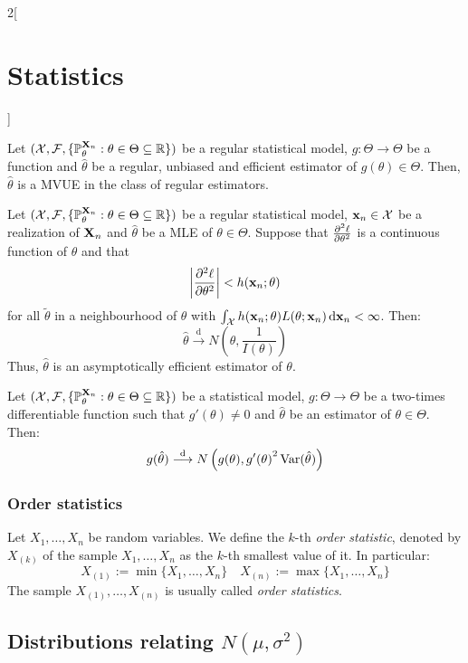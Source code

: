 \documentclass[../../../main.tex]{subfiles}
\begin{document}
\begin{multicols}{2}[\section{Statistics}]
\begin{definition}
  \end{definition}
  \begin{proposition}
    Let $(\mathcal{X},\mathcal{F},\{\mathbb{P}_{\theta}^{\boldsymbol{\mathrm{X}}_n}:\theta\in\Theta\subseteq\mathbb{R}\})$ be a regular statistical model, $g:\Theta\rightarrow\Theta$ be a function and ${\hat\theta}$ be a regular, unbiased and efficient estimator of $g({\theta})\in\Theta$. Then, $\hat\theta$ is a MVUE in the class of regular estimators.
  \end{proposition}
  \begin{theorem}
    Let $(\mathcal{X},\mathcal{F},\{\mathbb{P}_{\theta}^{\boldsymbol{\mathrm{X}}_n}:\theta\in\Theta\subseteq \mathbb{R}\})$ be a regular statistical model, $\boldsymbol{\mathrm{x}}_n\in\mathcal{X}$ be a realization of $\boldsymbol{\mathrm{X}}_n$ and ${\hat\theta}$ be a MLE of ${\theta}\in\Theta$. Suppose that $\pdv[2]{\ell}{\theta}$ is a continuous function of $\theta$ and that $$\left|\pdv[2]{\ell}{\theta}(\tilde{\theta};\boldsymbol{\mathrm{x}}_n)\right|<h(\boldsymbol{\mathrm{x}}_n;\theta)$$
    for all $\tilde{\theta}$ in a neighbourhood of $\theta$ with $\int_\mathcal{X}h(\boldsymbol{\mathrm{x}}_n;\theta)L(\theta;\boldsymbol{\mathrm{x}}_n)\dd{\boldsymbol{\mathrm{x}}_n}<\infty$. Then:
    $$\hat\theta\overset{\text{d}}{\longrightarrow}N\left(\theta,\frac{1}{I(\theta)}\right)$$
    Thus, ${\hat\theta}$ is an asymptotically efficient estimator of $\theta$.
  \end{theorem}
  \begin{theorem}
    Let $(\mathcal{X},\mathcal{F},\{\mathbb{P}_{\theta}^{\boldsymbol{\mathrm{X}}_n}:\theta\in\Theta\subseteq\mathbb{R}\})$ be a statistical model, $g:\Theta\rightarrow\Theta$ be a two-times differentiable function such that $g'(\theta)\ne 0$ and $\hat\theta$ be an estimator of $\theta\in\Theta$. Then:
    $$g(\hat\theta)\overset{\text{d}}{\longrightarrow}N\left(g(\theta),{g'(\theta)}^2\operatorname{Var}(\hat\theta)\right)$$
  \end{theorem}
  \subsubsection{Order statistics}
  \begin{definition}
    Let $X_1,\ldots,X_n$ be random variables. We define the $k$-th \emph{order statistic}, denoted by $X_{(k)}$ of the sample $X_1,\ldots,X_n$ as the $k$-th smallest value of it. In particular:
    $$X_{(1)}:=\min\{X_1,\ldots,X_n\}\quad X_{(n)}:=\max\{X_1,\ldots,X_n\}$$
    The sample $X_{(1)},\ldots,X_{(n)}$ is usually called \emph{order statistics}.
  \end{definition}
  \subsection{Distributions relating \texorpdfstring{$N(\mu,\sigma^2)$}{N(mu,sigma2)}}

\end{multicols}
\end{document}
